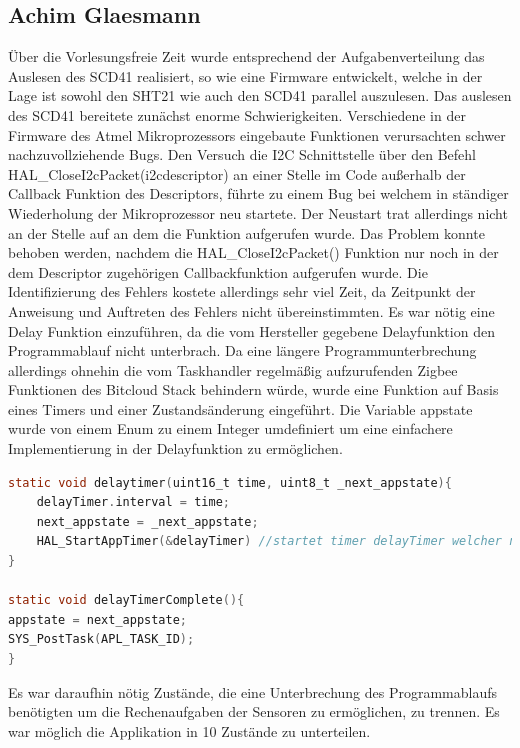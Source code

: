\documentclass[]{article}
\begin{document}
\subsection{Achim Glaesmann}
Über die Vorlesungsfreie Zeit wurde entsprechend der Aufgabenverteilung das Auslesen des SCD41 realisiert, so wie eine Firmware entwickelt, welche in der Lage ist sowohl den SHT21 wie auch den SCD41 parallel auszulesen. Das auslesen des SCD41 bereitete zunächst enorme Schwierigkeiten. Verschiedene in der Firmware des Atmel Mikroprozessors eingebaute Funktionen verursachten schwer nachzuvollziehende Bugs. Den Versuch die I2C Schnittstelle über den Befehl HAL_CloseI2cPacket(i2cdescriptor) an einer Stelle im Code außerhalb der Callback Funktion des Descriptors, führte zu einem Bug bei welchem in ständiger Wiederholung der Mikroprozessor neu startete. Der Neustart trat allerdings nicht an der Stelle auf an dem die Funktion aufgerufen wurde. Das Problem konnte behoben werden, nachdem die HAL_CloseI2cPacket() Funktion nur noch in der dem Descriptor zugehörigen Callbackfunktion aufgerufen wurde. Die Identifizierung des Fehlers kostete allerdings sehr viel Zeit, da Zeitpunkt der Anweisung und Auftreten des Fehlers nicht übereinstimmten.
Es war nötig eine Delay Funktion einzuführen, da die vom Hersteller gegebene Delayfunktion den Programmablauf nicht unterbrach. Da eine längere Programmunterbrechung allerdings ohnehin die vom Taskhandler regelmäßig aufzurufenden Zigbee Funktionen des Bitcloud Stack behindern würde, wurde eine Funktion auf Basis eines Timers und einer Zustandsänderung eingeführt. Die Variable appstate wurde von einem Enum zu einem Integer umdefiniert um eine einfachere Implementierung in der Delayfunktion zu ermöglichen. 

\begin{lstlisting}[language=C,frame=single, caption = Delay Timer, label = delay_timer] 
static void delaytimer(uint16_t time, uint8_t _next_appstate){
	delayTimer.interval = time;
	next_appstate = _next_appstate;
	HAL_StartAppTimer(&delayTimer) //startet timer delayTimer welcher nach der angegebenen Zeit in ms die Funktion delayTimerComplete(); aufruft
}

static void delayTimerComplete(){
appstate = next_appstate;
SYS_PostTask(APL_TASK_ID); 
}

\end{lstlisting} 

Es war daraufhin nötig Zustände, die eine Unterbrechung des Programmablaufs benötigten um die Rechenaufgaben der Sensoren zu ermöglichen, zu trennen. Es war möglich die Applikation in 10 Zustände zu unterteilen.
\end{document}
